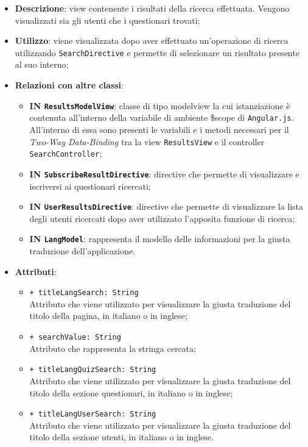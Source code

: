 \begin{itemize}
	\item \textbf{Descrizione}: view contenente i risultati della ricerca effettuata. Vengono visualizzati sia gli utenti che i questionari trovati;
	\item \textbf{Utilizzo}: viene visualizzata dopo aver effettuato un'operazione di ricerca utilizzando \texttt{SearchDirective} e permette di selezionare un risultato presente al suo interno; 
	\item \textbf{Relazioni con altre classi}:
	\begin{itemize}
		\item \textbf{IN \texttt{ResultsModelView}}: classe di tipo modelview la cui istanziazione è contenuta all'interno della variabile di ambiente \$scope di \texttt{Angular.js}. All'interno di essa sono presenti le variabili e i metodi necessari per il \textit{Two-Way Data-Binding} tra la view \texttt{ResultsView} e il controller \texttt{SearchController};
		\item \textbf{IN \texttt{SubscribeResultDirective}}: directive che permette di visualizzare e iscriversi ai questionari ricercati;
		\item \textbf{IN \texttt{UserResultsDirective}}: directive che permette di visualizzare la lista degli utenti ricercati dopo aver utilizzato l'apposita funzione di ricerca;
		\item \textbf{IN \texttt{LangModel}}: rappresenta il modello delle informazioni per la giusta traduzione dell'applicazione.
	\end{itemize}
	\item \textbf{Attributi}:
		\begin{itemize}
			\item \texttt{+ titleLangSearch: String} \\ Attributo che viene utilizzato per visualizzare la giusta traduzione del titolo della pagina, in italiano o in inglese;
			\item \texttt{+ searchValue: String} \\ Attributo che rappresenta la stringa cercata;
			\item \texttt{+ titleLangQuizSearch: String} \\ Attributo che viene utilizzato per visualizzare la giusta traduzione del titolo della sezione questionari, in italiano o in inglese;
			\item \texttt{+ titleLangUserSearch: String} \\ Attributo che viene utilizzato per visualizzare la giusta traduzione del titolo della sezione utenti, in italiano o in inglese.
		\end{itemize}
\end{itemize}